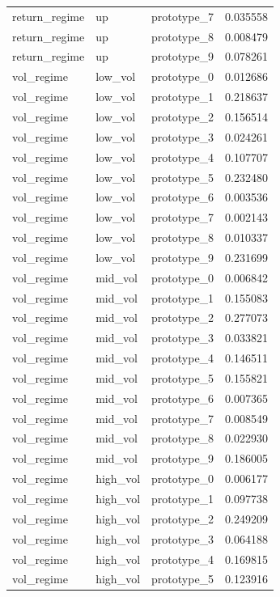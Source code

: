 \begin{tabular}{lllr}
return\_regime & up & prototype\_7 & 0.035558 \\
return\_regime & up & prototype\_8 & 0.008479 \\
return\_regime & up & prototype\_9 & 0.078261 \\
vol\_regime & low\_vol & prototype\_0 & 0.012686 \\
vol\_regime & low\_vol & prototype\_1 & 0.218637 \\
vol\_regime & low\_vol & prototype\_2 & 0.156514 \\
vol\_regime & low\_vol & prototype\_3 & 0.024261 \\
vol\_regime & low\_vol & prototype\_4 & 0.107707 \\
vol\_regime & low\_vol & prototype\_5 & 0.232480 \\
vol\_regime & low\_vol & prototype\_6 & 0.003536 \\
vol\_regime & low\_vol & prototype\_7 & 0.002143 \\
vol\_regime & low\_vol & prototype\_8 & 0.010337 \\
vol\_regime & low\_vol & prototype\_9 & 0.231699 \\
vol\_regime & mid\_vol & prototype\_0 & 0.006842 \\
vol\_regime & mid\_vol & prototype\_1 & 0.155083 \\
vol\_regime & mid\_vol & prototype\_2 & 0.277073 \\
vol\_regime & mid\_vol & prototype\_3 & 0.033821 \\
vol\_regime & mid\_vol & prototype\_4 & 0.146511 \\
vol\_regime & mid\_vol & prototype\_5 & 0.155821 \\
vol\_regime & mid\_vol & prototype\_6 & 0.007365 \\
vol\_regime & mid\_vol & prototype\_7 & 0.008549 \\
vol\_regime & mid\_vol & prototype\_8 & 0.022930 \\
vol\_regime & mid\_vol & prototype\_9 & 0.186005 \\
vol\_regime & high\_vol & prototype\_0 & 0.006177 \\
vol\_regime & high\_vol & prototype\_1 & 0.097738 \\
vol\_regime & high\_vol & prototype\_2 & 0.249209 \\
vol\_regime & high\_vol & prototype\_3 & 0.064188 \\
vol\_regime & high\_vol & prototype\_4 & 0.169815 \\
vol\_regime & high\_vol & prototype\_5 & 0.123916 \\

\end{tabular}
